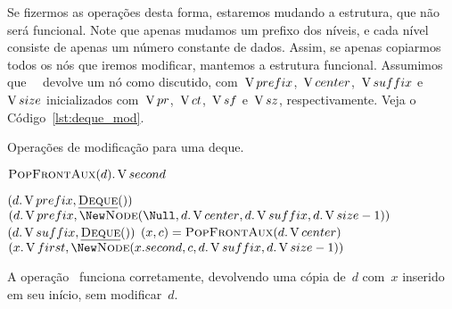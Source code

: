 \documentclass[main.tex]{subfiles}
\begin{document}
Se fizermos as operações desta forma, estaremos mudando a estrutura, que não será funcional. Note que apenas mudamos um prefixo dos níveis, e cada nível consiste de apenas um número constante de dados.
Assim, se apenas copiarmos todos os nós que iremos modificar, mantemos a estrutura funcional. Assumimos que~\mbox{ } devolve um nó como discutido, com~$\operatorname{V}{prefix}$,~$\operatorname{V}{center}$,~$\operatorname{V}{suffix}$ e~$\operatorname{V}{size}$ inicializados com~$\operatorname{V}{pr}$,~$\operatorname{V}{ct}$,~$\operatorname{V}{sf}$ e~$\operatorname{V}{sz}$, respectivamente. Veja o Código~\ref{lst:deque_mod}.

\begin{algorithm}
\caption{Operações de modificação para uma deque.} \label{lst:deque_mod}
\begin{algorithmic}[1]

		\State \Return \New {} \label{line:dm:puf1}
	 \label{line:dm:puf2}
		\State \Return \New {}\label{line:dm:puf2_1}
	\Else
		\State \Return \New {} \label{line:dm:puf3}
	\EndIf
\EndFunction

	\State \Return $\Call{PopFrontAux}{d}.\V{second}$
\EndFunction


	 \label{line:dm:pof0}
		\State \Return $(d.\operatorname{V}{prefix}, \mbox{\textsc{\underline{Deque}}\ensuremath{()}})$ \label{line:dm:pof00}
	 \label{line:dm:pof1}
		\State \Return $(d.\V{prefix}, \New \Call{Node}{\Null, d.\V{center}, d.\V{suffix}, d.\V{size} - 1})$ \label{line:dm:pof1_2}
	 \label{line:dm:pof2}
		\State \Return $(d.\V{suffix}, \funcAPI{Deque}{\null})$ \label{line:dm:pof2-0}
	\Else
		\State $(x, c) = \Call{PopFrontAux}{d.\V{center}}$
		\State \Return $(x.\V{first}, \New \Call{Node}{x.second, c, d.\V{suffix}, d.\V{size} - 1})$ \label{line:dm:pof3}
	\EndIf
\EndFunction

\end{algorithmic}
\end{algorithm}

\begin{proposition}
A operação~ funciona corretamente, devolvendo uma cópia de~$d$ com~$x$ inserido em seu início, sem modificar~$d$.
\end{proposition}
\end{document}
